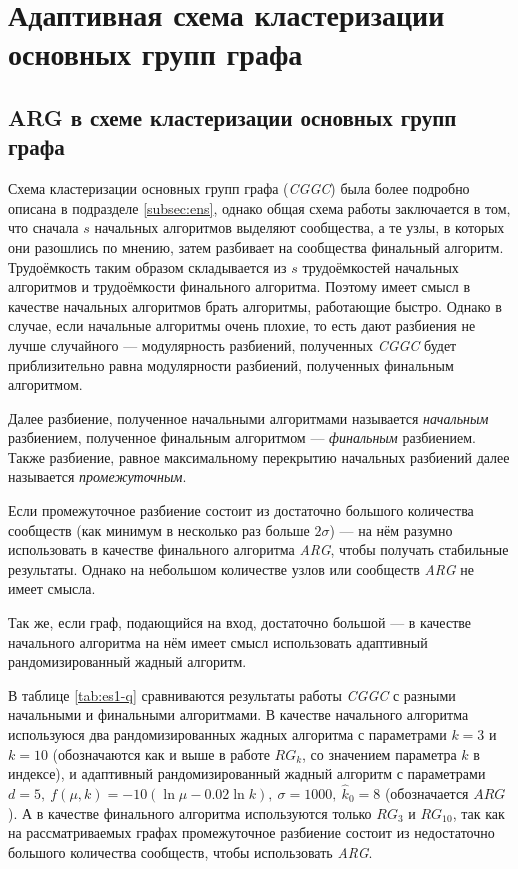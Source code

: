 
\section{Адаптивная схема кластеризации основных групп графа}
\label{sec:ACGGC}



\subsection{ARG в схеме кластеризации основных групп графа}
\label{subsec:arg_in_cggc}

Схема кластеризации основных групп графа (\emph{CGGC}) была более подробно описана в подразделе \ref{subsec:ens}, однако общая схема работы заключается в том, что сначала $s$ начальных алгоритмов выделяют сообщества, а те узлы, в которых они разошлись по мнению, затем разбивает на сообщества финальный алгоритм. Трудоёмкость таким образом складывается из $s$ трудоёмкостей начальных алгоритмов и трудоёмкости финального алгоритма. Поэтому имеет смысл в качестве начальных алгоритмов брать алгоритмы, работающие быстро. Однако в случае, если начальные алгоритмы очень плохие, то есть дают разбиения не лучше случайного --- модулярность разбиений, полученных \emph{CGGC} будет приблизительно равна модулярности разбиений, полученных финальным алгоритмом.

Далее разбиение, полученное начальными алгоритмами называется \emph{начальным} разбиением, полученное финальным алгоритмом --- \emph{финальным} разбиением. Также  разбиение, равное максимальному перекрытию начальных разбиений далее называется \emph{промежуточным}.

Если промежуточное разбиение состоит из достаточно большого количества сообществ (как минимум в несколько раз больше $2\sigma$) --- на нём разумно использовать в качестве финального алгоритма \emph{ARG}, чтобы получать стабильные результаты. Однако на небольшом количестве узлов или сообществ \emph{ARG} не имеет смысла.

Так же, если граф, подающийся на вход, достаточно большой --- в качестве начального алгоритма на нём имеет смысл использовать адаптивный рандомизированный жадный алгоритм.

В таблице \ref{tab:es1-q} сравниваются результаты работы \emph{CGGC} с разными начальными и финальными алгоритмами. В качестве начального алгоритма используюся два рандомизированных жадных алгоритма с параметрами $k = 3$ и $k = 10$ (обозначаются как и выше в работе $RG_k$, со значением параметра $k$ в индексе), и адаптивный рандомизированный жадный алгоритм с параметрами $d = 5,\ f(\mu, k) = -10(\ln \mu - 0.02 \ln k),\ \sigma = 1000,\ \hat{k}_0 = 8$ (обозначается $ARG$). А в качестве финального алгоритма используются только $RG_3$ и $RG_{10}$, так как на рассматриваемых графах промежуточное разбиение состоит из недостаточно большого количества сообществ, чтобы использовать \emph{ARG}.

